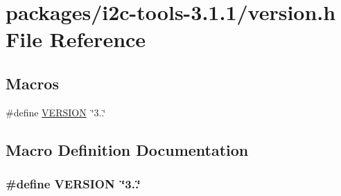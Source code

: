 \hypertarget{i2c-tools-3_81_81_2version_8h}{}\section{packages/i2c-\/tools-\/3.1.1/version.h File Reference}
\label{i2c-tools-3_81_81_2version_8h}
\subsection*{Macros}
\begin{DoxyCompactItemize}
\item 
\#define \hyperlink{i2c-tools-3_81_81_2version_8h_a1c6d5de492ac61ad29aec7aa9a436bbf}{V\+E\+R\+S\+I\+O\+N}~\char`\"{}3..\char`\"{}
\end{DoxyCompactItemize}


\subsection{Macro Definition Documentation}
\hypertarget{i2c-tools-3_81_81_2version_8h_a1c6d5de492ac61ad29aec7aa9a436bbf}{}
\subsubsection[{V\+E\+R\+S\+I\+O\+N}]{\setlength{\rightskip}{0pt plus 5cm}\#define V\+E\+R\+S\+I\+O\+N~\char`\"{}3..\char`\"{}}\label{i2c-tools-3_81_81_2version_8h_a1c6d5de492ac61ad29aec7aa9a436bbf}
